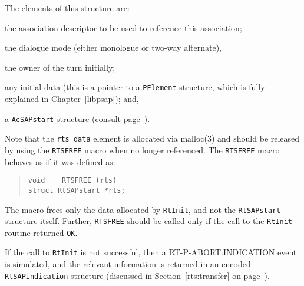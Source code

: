 The elements of this structure are:
\begin{describe}
\item[\verb"rts\_sd":] the association-descriptor to be used to
reference this association;

\item[\verb"rts\_mode":] the dialogue mode (either monologue or two-way
alternate),

\item[\verb"rts\_turn":] the owner of the turn initially;

\item[\verb"rts\_data":] any initial data (this is a pointer to a
\verb"PElement" structure, which is fully explained in Chapter~\ref{libpsap});
and,

\item[\verb"rts\_start":] a \verb"AcSAPstart" structure
(consult page~\pageref{AcSAPstart}).
\end{describe}
Note that the \verb"rts_data" element is allocated via \man malloc(3) and
should be released by using the \verb"RTSFREE" macro when no longer referenced.
The \verb"RTSFREE" macro behaves as if it was defined as:
\begin{quote}\small\begin{verbatim}
void    RTSFREE (rts)
struct RtSAPstart *rts;
\end{verbatim}\end{quote}
The macro frees only the data allocated by \verb"RtInit",
and not the \verb"RtSAPstart" structure itself.
Further,
\verb"RTSFREE" should be called only if the call to the \verb"RtInit"
routine returned \verb"OK".

If the call to \verb"RtInit" is not successful,
then a {\sf RT-P-ABORT.INDICATION\/} event is simulated,
and the relevant information is returned in an encoded
\verb"RtSAPindication" structure
(discussed in Section~\ref{rts:transfer} on page~\pageref{rts:transfer}).

